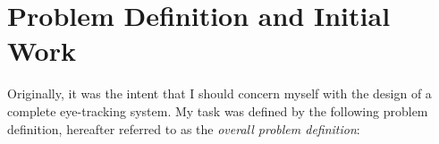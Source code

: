 
\section{Problem Definition and Initial Work}
\label{intro:problem}

Originally, it was the intent that I should concern myself with the
design of a complete eye-tracking system.  My task was defined by the
following problem definition, hereafter referred to as the {\em
  overall problem definition\/}:

